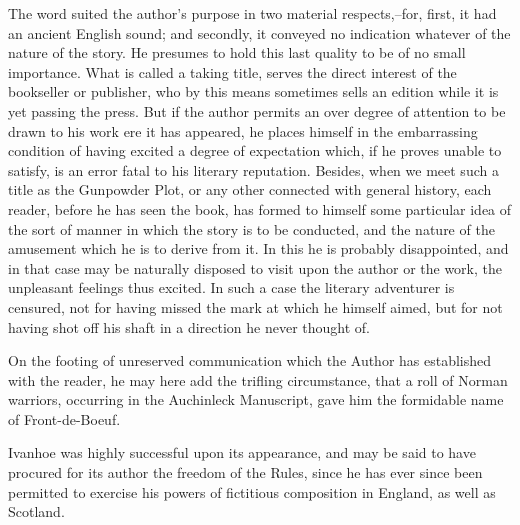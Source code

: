 The word suited the author's purpose in two material respects,--for,
first, it had an ancient English sound; and secondly, it conveyed no
indication whatever of the nature of the story. He presumes to hold this
last quality to be of no small importance. What is called a taking
title, serves the direct interest of the bookseller or publisher, who by
this means sometimes sells an edition while it is yet passing the press.
But if the author permits an over degree of attention to be drawn to his
work ere it has appeared, he places himself in the embarrassing
condition of having excited a degree of expectation which, if he proves
unable to satisfy, is an error fatal to his literary reputation.
Besides, when we meet such a title as the Gunpowder Plot, or any other
connected with general history, each reader, before he has seen the
book, has formed to himself some particular idea of the sort of manner
in which the story is to be conducted, and the nature of the amusement
which he is to derive from it. In this he is probably disappointed, and
in that case may be naturally disposed to visit upon the author or the
work, the unpleasant feelings thus excited. In such a case the literary
adventurer is censured, not for having missed the mark at which he
himself aimed, but for not having shot off his shaft in a direction he
never thought of.

On the footing of unreserved communication which the Author has
established with the reader, he may here add the trifling circumstance,
that a roll of Norman warriors, occurring in the Auchinleck Manuscript,
gave him the formidable name of Front-de-Boeuf.

Ivanhoe was highly successful upon its appearance, and may be said to
have procured for its author the freedom of the Rules, since he has ever
since been permitted to exercise his powers of fictitious composition in
England, as well as Scotland.

